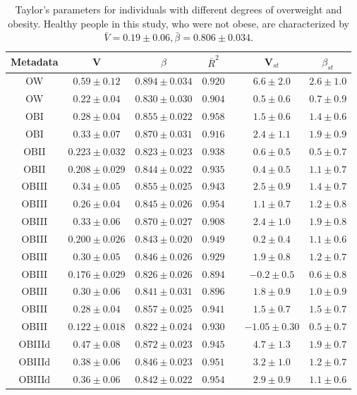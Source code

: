 \documentclass[12pt,oneside,letterpaper]{article}
\begin{document}
\begin{table}
\caption{Taylor's parameters for individuals with different degrees of overweight and obesity\cite{LEA}. Healthy people in this study, who were not obese, are characterized by $\bar{V} = 0.19 \pm 0.06, \bar{\beta} = 0.806 \pm 0.034$.} 
  \begin{center}
    \begin{tabular}{*{7}{c}}
	    \hline
		Metadata&V&$\beta$&$\bar{R}^2$&&V$_{st}$&$\beta_{st}$\\
		\hline
		OW&$0.59 \pm 0.12$&$0.894 \pm 0.034$&$0.920$&&$6.6 \pm 2.0$&$2.6 \pm 1.0$\\
		OW&$0.22 \pm 0.04$&$0.830 \pm 0.030$&$0.904$&&$0.5 \pm 0.6$&$0.7 \pm 0.9$\\
		\hline
		OBI&$0.28 \pm 0.04$&$0.855 \pm 0.022$&$0.958$&&$1.5 \pm 0.6$&$1.4 \pm 0.6$\\
		OBI&$0.33 \pm 0.07$&$0.870 \pm 0.031$&$0.916$&&$2.4 \pm 1.1$&$1.9 \pm 0.9$\\
		\hline
		OBII&$0.223 \pm 0.032$&$0.823 \pm 0.023$&$0.938$&&$0.6 \pm 0.5$&$0.5 \pm 0.7$\\
		OBII&$0.208 \pm 0.029$&$0.844 \pm 0.022$&$0.935$&&$0.4 \pm 0.5$&$1.1 \pm 0.7$\\
		\hline
		OBIII&$0.34 \pm 0.05$&$0.855 \pm 0.025$&$0.943$&&$2.5 \pm 0.9$&$1.4 \pm 0.7$\\
		OBIII&$0.26 \pm 0.04$&$0.845 \pm 0.026$&$0.954$&&$1.1 \pm 0.7$&$1.2 \pm 0.8$\\
		OBIII&$0.33 \pm 0.06$&$0.870 \pm 0.027$&$0.908$&&$2.4 \pm 1.0$&$1.9 \pm 0.8$\\
		OBIII&$0.200 \pm 0.026$&$0.843 \pm 0.020$&$0.949$&&$0.2 \pm 0.4$&$1.1 \pm 0.6$\\
		OBIII&$0.30 \pm 0.05$&$0.846 \pm 0.026$&$0.929$&&$1.9 \pm 0.8$&$1.2 \pm 0.7$\\
		OBIII&$0.176 \pm 0.029$&$0.826 \pm 0.026$&$0.894$&&$-0.2 \pm 0.5$&$0.6 \pm 0.8$\\
		OBIII&$0.30 \pm 0.06$&$0.841 \pm 0.031$&$0.896$&&$1.8 \pm 0.9$&$1.0 \pm 0.9$\\
		OBIII&$0.28 \pm 0.04$&$0.857 \pm 0.025$&$0.941$&&$1.5 \pm 0.7$&$1.5 \pm 0.7$\\
		OBIII&$0.122 \pm 0.018$&$0.822 \pm 0.024$&$0.930$&&$-1.05 \pm 0.30$&$0.5 \pm 0.7$\\
		\hline
		OBIIId&$0.47 \pm 0.08$&$0.872 \pm 0.023$&$0.945$&&$4.7 \pm 1.3$&$1.9 \pm 0.7$\\
		OBIIId&$0.38 \pm 0.06$&$0.846 \pm 0.023$&$0.951$&&$3.2 \pm 1.0$&$1.2 \pm 0.7$\\
		OBIIId&$0.36 \pm 0.06$&$0.842 \pm 0.022$&$0.954$&&$2.9 \pm 0.9$&$1.1 \pm 0.6$\\
	    \hline
    	\hline
    \end{tabular}
  \end{center}
  \label{tab:LEA}
\end{table}
\end{document}
